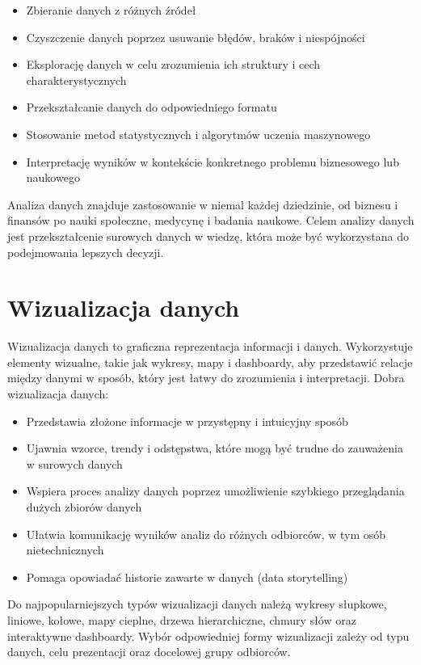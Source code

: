 \documentclass[
  polish,
  letterpaper,
  DIV=11,
  numbers=noendperiod]{scrreprt}
\providecommand{\tightlist}{%
  \setlength{\itemsep}{0pt}\setlength{\parskip}{0pt}}
\begin{document}
\begin{itemize}
\tightlist
\item
  Zbieranie danych z różnych źródeł
\item
  Czyszczenie danych poprzez usuwanie błędów, braków i niespójności
\item
  Eksplorację danych w celu zrozumienia ich struktury i cech
  charakterystycznych
\item
  Przekształcanie danych do odpowiedniego formatu
\item
  Stosowanie metod statystycznych i algorytmów uczenia maszynowego
\item
  Interpretację wyników w kontekście konkretnego problemu biznesowego
  lub naukowego
\end{itemize}

Analiza danych znajduje zastosowanie w niemal każdej dziedzinie, od
biznesu i finansów po nauki społeczne, medycynę i badania naukowe. Celem
analizy danych jest przekształcenie surowych danych w wiedzę, która może
być wykorzystana do podejmowania lepszych decyzji.

\section{Wizualizacja danych}\label{wizualizacja-danych}

Wizualizacja danych to graficzna reprezentacja informacji i danych.
Wykorzystuje elementy wizualne, takie jak wykresy, mapy i dashboardy,
aby przedstawić relacje między danymi w sposób, który jest łatwy do
zrozumienia i interpretacji. Dobra wizualizacja danych:

\begin{itemize}
\tightlist
\item
  Przedstawia złożone informacje w przystępny i intuicyjny sposób
\item
  Ujawnia wzorce, trendy i odstępstwa, które mogą być trudne do
  zauważenia w surowych danych
\item
  Wspiera proces analizy danych poprzez umożliwienie szybkiego
  przeglądania dużych zbiorów danych
\item
  Ułatwia komunikację wyników analiz do różnych odbiorców, w tym osób
  nietechnicznych
\item
  Pomaga opowiadać historie zawarte w danych (data storytelling)
\end{itemize}

Do najpopularniejszych typów wizualizacji danych należą wykresy
słupkowe, liniowe, kołowe, mapy cieplne, drzewa hierarchiczne, chmury
słów oraz interaktywne dashboardy. Wybór odpowiedniej formy wizualizacji
zależy od typu danych, celu prezentacji oraz docelowej grupy odbiorców.
\end{document}
